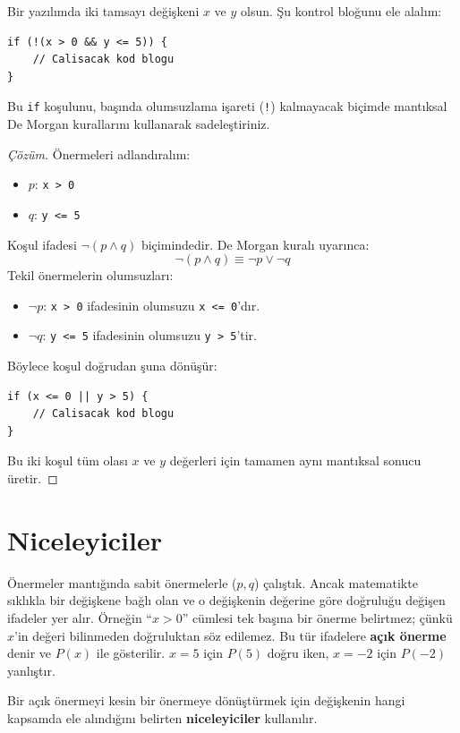 \begin{example}
Bir yazılımda iki tamsayı değişkeni $x$ ve $y$ olsun. Şu kontrol bloğunu ele alalım:
\begin{lstlisting}[language=CTemel]
if (!(x > 0 && y <= 5)) {
    // Calisacak kod blogu
}
\end{lstlisting}
Bu \texttt{if} koşulunu, başında olumsuzlama işareti (\texttt{!}) kalmayacak biçimde mantıksal De Morgan kurallarını kullanarak sadeleştiriniz.
\end{example}
\begin{proof}[Çözüm]
Önermeleri adlandıralım:
\begin{itemize}
  \item $p$: \texttt{x > 0}
  \item $q$: \texttt{y <= 5}
\end{itemize}
Koşul ifadesi $\neg (p \land q)$ biçimindedir. De Morgan kuralı uyarınca:
\[ \neg(p \land q) \equiv \neg p \lor \neg q \]
Tekil önermelerin olumsuzları:
\begin{itemize}
  \item $\neg p$: \texttt{x > 0} ifadesinin olumsuzu \texttt{x <= 0}'dır.
  \item $\neg q$: \texttt{y <= 5} ifadesinin olumsuzu \texttt{y > 5}'tir.
\end{itemize}
Böylece koşul doğrudan şuna dönüşür:
\begin{lstlisting}[language=CTemel]
if (x <= 0 || y > 5) {
    // Calisacak kod blogu
}
\end{lstlisting}
Bu iki koşul tüm olası $x$ ve $y$ değerleri için tamamen aynı mantıksal sonucu üretir.
\end{proof}


\section{Niceleyiciler}

Önermeler mantığında sabit önermelerle ($p, q$) çalıştık. Ancak matematikte sıklıkla bir değişkene bağlı olan ve o değişkenin değerine göre doğruluğu değişen ifadeler yer alır. Örneğin ``$x > 0$'' cümlesi tek başına bir önerme belirtmez; çünkü $x$'in değeri bilinmeden doğruluktan söz edilemez. Bu tür ifadelere \textbf{açık önerme} denir ve $P(x)$ ile gösterilir. $x = 5$ için $P(5)$ doğru iken, $x = -2$ için $P(-2)$ yanlıştır.

Bir açık önermeyi kesin bir önermeye dönüştürmek için değişkenin hangi kapsamda ele alındığını belirten \textbf{niceleyiciler} kullanılır.

